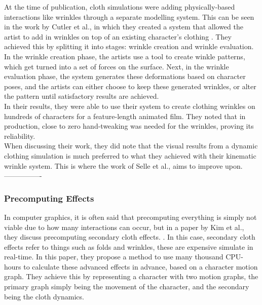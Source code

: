 \documentclass[12pt,a4paper]{article}
\begin{document}
At the time of publication, cloth simulations were adding physically-based interactions like wrinkles through a separate modelling system. This can be seen in the work by Cutler et al., in which they created a system that allowed the artist to add in wrinkles on top of an existing character's clothing \cite{10.1145/1073368.1073384}. They achieved this by splitting it into stages: wrinkle creation and wrinkle evaluation. In the wrinkle creation phase, the artists use a tool to create winkle patterns, which get turned into a set of forces on the surface. Next, in the wrinkle evaluation phase, the system generates these deformations based on character poses, and the artists can either choose to keep these generated wrinkles, or alter the pattern until satisfactory results are achieved.\\
In their results, they were able to use their system to create clothing wrinkles on hundreds of characters for a feature-length animated film. They noted that in production, close to zero hand-tweaking was needed for the wrinkles, proving its reliability.\\
When discussing their work, they did note that the visual results from a dynamic clothing simulation is much preferred to what they achieved with their kinematic wrinkle system. This is where the work of Selle et al., aims to improve upon. \\



----------------
\subsubsection{Precomputing Effects}
In computer graphics, it is often said that precomputing everything is simply not viable due to how many interactions can occur, but in a paper by Kim et al., they discuss precomputing secondary cloth effects. \cite{kim2013near}. In this case, secondary cloth effects refer to things such as folds and wrinkles, these are expensive simulate in real-time. In this paper, they propose a method to use many thousand CPU-hours to calculate these advanced effects in advance, based on a character motion graph. They achieve this by representing a character with two motion graphs, the primary graph simply being the movement of the character, and the secondary being the cloth dynamics. \\
\end{document}
